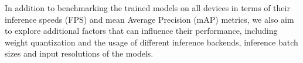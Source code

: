 In addition to benchmarking the trained models on all devices in terms of their
inference speeds (FPS) and mean Average Precision (mAP) metrics, we also aim to
explore additional factors that can influence their performance, including
weight quantization and the usage of different inference backends, inference
batch sizes and input resolutions of the models.

